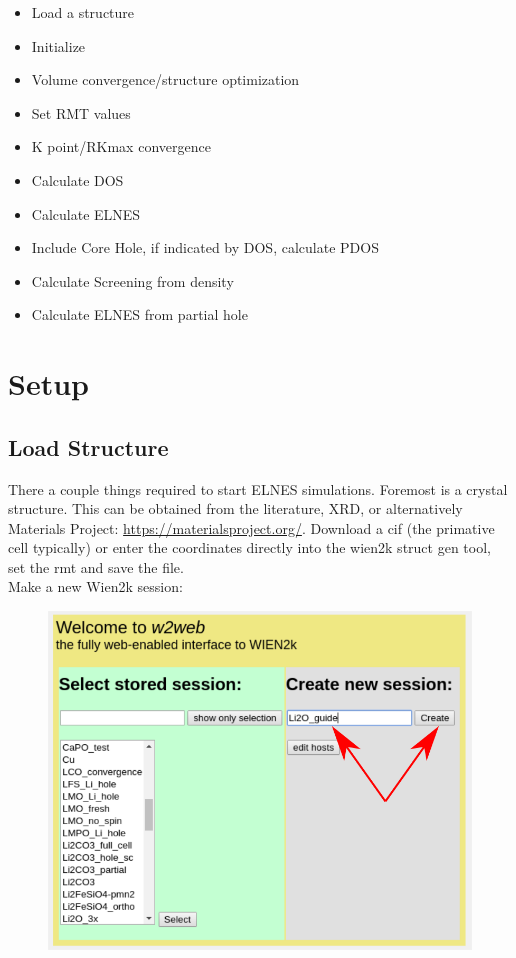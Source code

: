 \documentclass[12pt]{article}
\begin{document}
\begin{itemize}
	\item Load a structure
	\item Initialize
	\item Volume convergence/structure optimization
	\item Set RMT values
	\item K point/RKmax convergence
	\item Calculate DOS
	\item Calculate ELNES
	\item Include Core Hole, if indicated by DOS, calculate PDOS
	\item Calculate Screening from density
	\item Calculate ELNES from partial hole
\end{itemize}


\section{Setup}	

\subsection{Load Structure}
There a couple things required to start ELNES simulations.  Foremost is a crystal structure.  This can be obtained from the literature, XRD, or alternatively Materials Project: \url{https://materialsproject.org/}.  Download a cif (the primative cell typically) or enter the coordinates directly into the wien2k struct gen tool, set the rmt and save the file.  \\

Make a new Wien2k session: 
\begin{figure}[H]
\includegraphics[scale=0.3]{./images/new_session.png}
\end{figure}
\end{document}
